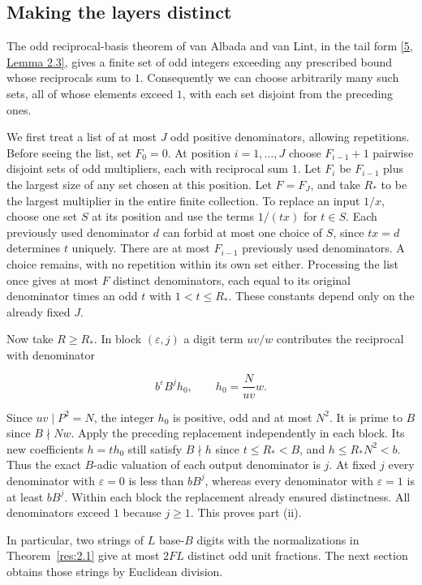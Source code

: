 \documentclass[11pt,a4paper]{article}
\begin{document}
\subsection{Making the layers distinct}

The odd reciprocal-basis theorem of van Albada and van Lint, in the tail form \hyperlink{ref-5}{[5, Lemma 2.3]}, gives a finite set of odd integers exceeding any prescribed bound whose reciprocals sum to $1$. Consequently we can choose arbitrarily many such sets, all of whose elements exceed $1$, with each set disjoint from the preceding ones.

We first treat a list of at most $J$ odd positive denominators, allowing repetitions. Before seeing the list, set $F_0=0$. At position $i=1,\ldots,J$ choose $F_{i-1}+1$ pairwise disjoint sets of odd multipliers, each with reciprocal sum $1$. Let $F_i$ be $F_{i-1}$ plus the largest size of any set chosen at this position. Let $F=F_J$, and take $R_*$ to be the largest multiplier in the entire finite collection. To replace an input $1/x$, choose one set $S$ at its position and use the terms $1/(tx)$ for $t\in S$. Each previously used denominator $d$ can forbid at most one choice of $S$, since $tx=d$ determines $t$ uniquely. There are at most $F_{i-1}$ previously used denominators. A choice remains, with no repetition within its own set either. Processing the list once gives at most $F$ distinct denominators, each equal to its original denominator times an odd $t$ with $1<t\le R_*$. These constants depend only on the already fixed $J$.

Now take $R\ge R_*$. In block $(\varepsilon,j)$ a digit term $uv/w$ contributes the reciprocal with denominator

\[
b^\varepsilon B^j h_0,\qquad h_0=\frac{N}{uv}w .
\]

Since $uv\mid P^2=N$, the integer $h_0$ is positive, odd and at most $N^2$. It is prime to $B$ since $B\nmid Nw$. Apply the preceding replacement independently in each block. Its new coefficients $h=th_0$ still satisfy $B\nmid h$ since $t\le R_*<B$, and $h\le R_*N^2<b$. Thus the exact $B$-adic valuation of each output denominator is $j$. At fixed $j$ every denominator with $\varepsilon=0$ is less than $bB^j$, whereas every denominator with $\varepsilon=1$ is at least $bB^j$. Within each block the replacement already ensured distinctness. All denominators exceed $1$ because $j\ge1$. This proves part (ii).

In particular, two strings of $L$ base-$B$ digits with the normalizations in Theorem~\ref{res:2.1} give at most $2FL$ distinct odd unit fractions. The next section obtains those strings by Euclidean division.
\end{document}
